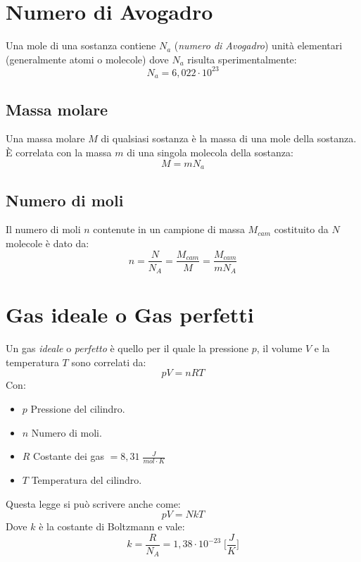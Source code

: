     \section{Numero di Avogadro} Una mole di una sostanza contiene $N_a$
    (\textit{numero di Avogadro}) unità elementari (generalmente atomi o 
    molecole) dove $N_a$ risulta sperimentalmente:
        \begin{equation*}
            N_a = 6,022 \cdot 10^{23}
        \end{equation*}

        \subsection{Massa molare} Una massa molare $M$ di qualsiasi sostanza è
        la massa di una mole della sostanza. È correlata con la massa $m$ di 
        una singola molecola della sostanza:
            \begin{equation}
                M = mN_a
            \end{equation}
        
        \subsection{Numero di moli} Il numero di moli $n$ contenute in un 
        campione di massa $M_{cam}$ costituito da $N$ molecole è dato da:
            \begin{equation}
                n = \frac{N}{N_A} = \frac{M_{cam}}{M} = \frac{M_{cam}}{mN_A}
            \end{equation}

    \section{Gas ideale o Gas perfetti} \label{gasp} Un gas \textit{ideale} o 
        \textit{ perfetto} è quello per il quale la pressione $p$, il volume 
        $V$ e la temperatura $T$ sono correlati da:
        \begin{equation}
            pV = nRT
        \end{equation}
    Con:
        \begin{itemize}
            \item $p$ Pressione del cilindro.
            \item $n$ Numero di moli.
            \item $R$ Costante dei gas $= 8,31 \; \frac{J}{mol \cdot K}$
            \item $T$ Temperatura del cilindro.
        \end{itemize}
    Questa legge si può scrivere anche come:
        \begin{equation}
            pV = NkT
        \end{equation}
    Dove $k$ è la costante di Boltzmann e vale:
        \begin{equation*}
            k = \frac{R}{N_A} = 1,38 \cdot 10^{-23} \; \Bigg[\frac{J}{K}\Bigg]
        \end{equation*}

